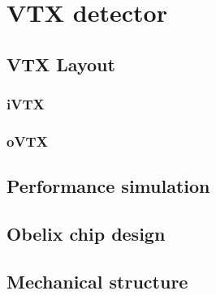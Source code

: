 \chapter{VTX detector}



\section{VTX Layout}

\subsection{iVTX}

\subsection{oVTX}


\section{Performance simulation}



\section{Obelix chip design}




\section{Mechanical structure}


